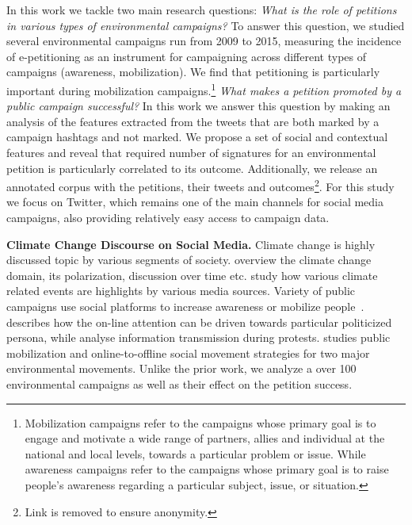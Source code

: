 In this work we tackle two main research questions: 
\textit{What is the role of petitions in various types of environmental campaigns?}
To answer this question, we studied several environmental campaigns run from 2009 to 2015, measuring the incidence of e-petitioning as an instrument for campaigning across different types of campaigns (awareness, mobilization). We find that petitioning is particularly important during mobilization campaigns.\footnote{Mobilization campaigns refer to the campaigns whose primary goal is to engage and motivate a wide range of partners, allies and individual at the national and local levels, towards a particular problem or issue. While awareness campaigns refer to the campaigns whose primary goal is to raise people’s awareness regarding a particular subject, issue, or situation.}
\textit{What makes a petition promoted by a public campaign successful?} In this work we answer this question by making an analysis of the features extracted from the tweets that are both marked by a campaign hashtags and not marked.
%
We propose a set of social and contextual features and reveal that required number of signatures for an environmental petition is particularly correlated to its outcome.
Additionally, we release an annotated corpus with the petitions, their tweets and outcomes\footnote{Link is removed to ensure anonymity.}.
For this study we focus on Twitter, which remains one of the main channels for social media campaigns, also providing relatively easy access to campaign data.

\textbf{Climate Change Discourse on Social Media.} Climate change is highly discussed topic by various segments of society. \cite{Kirilenko2014} overview the climate change domain, its polarization, discussion over time etc. \cite{Olteanu2015} study how various climate related events are highlights by various media sources.
Variety of public campaigns use social platforms to increase awareness or mobilize people~\cite{Mahmud2014}.
\cite{Tufekci2013} describes how the on-line attention can be driven towards particular politicized persona, while \cite{gonzalez2013networked} analyse information transmission during protests.
\cite{hestres2013preaching} studies public mobilization and online-to-offline social movement strategies for two major environmental movements. Unlike the prior work, we analyze a over 100 environmental campaigns as well as their effect on the petition success.

